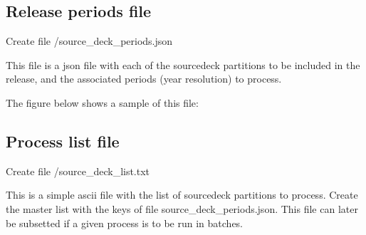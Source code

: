 \documentclass[letterpaper,10pt,english]{sphinxmanual}
\begin{document}
\subsection{Release periods file}
\label{\detokenize{index:release-periods-file}}\label{\detokenize{index:id1}}
Create file /source\_deck\_periods.json

This file is a json file with each of the source\sphinxhyphen{}deck partitions to be included
in the release, and the associated periods (year resolution) to process.

The figure below shows a sample of this file:

\begin{sphinxVerbatim}[commandchars=\\\{\}]
     
         
         
     
         
         
     
         
         
\end{sphinxVerbatim}


\subsection{Process list file}
\label{\detokenize{index:process-list-file}}\label{\detokenize{index:id2}}
Create file /source\_deck\_list.txt

This is a simple ascii file with the list of source\sphinxhyphen{}deck partitions to process.
Create the master list with the keys of file source\_deck\_periods.json. This file
can later be subsetted if a given process is to be run in batches.
\end{document}
